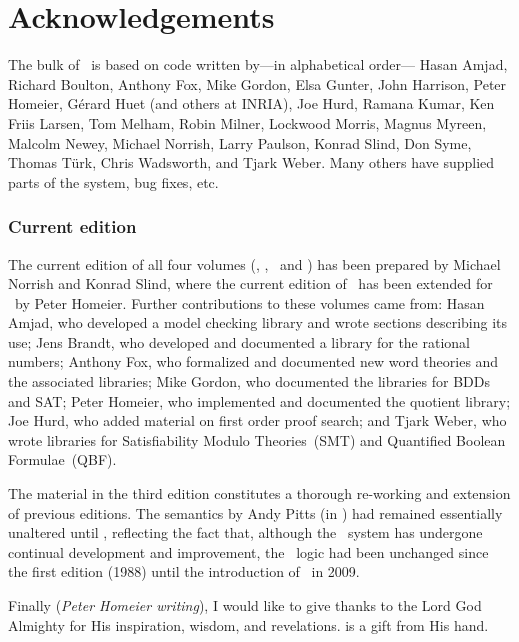 \chapter*{Acknowledgements}

The bulk of \HOLW\ is based on code written by---in alphabetical
order---%
Hasan Amjad,
Richard Boulton,
Anthony Fox,
Mike Gordon,
Elsa Gunter,
John Harrison,
Peter Homeier,
G\'erard Huet (and others at INRIA),
Joe Hurd,
Ramana Kumar,
Ken Friis Larsen,
Tom Melham,
Robin Milner,
Lockwood Morris,
Magnus Myreen,
Malcolm Newey,
Michael Norrish,
Larry Paulson,
Konrad Slind,
Don Syme,
Thomas T\"urk,
Chris Wadsworth,
and
Tjark Weber.
Many others have supplied parts of the system, bug fixes, etc.

\subsection*{Current edition}

The current edition of all four volumes (\LOGIC, \TUTORIAL,
\DESCRIPTION\ and \REFERENCE) has been prepared by Michael Norrish and
Konrad Slind, 
where the current edition of \TUTORIAL\ has been extended for \HOLW\ 
by Peter Homeier.
Further contributions to these volumes came from: Hasan
Amjad, who developed a model checking library and wrote sections
describing its use; Jens Brandt, who developed and documented a
library for the rational numbers; Anthony Fox, who formalized and
documented new word theories and the associated libraries; Mike
Gordon, who documented the libraries for BDDs and SAT; Peter Homeier,
who implemented and documented the quotient library; Joe Hurd, who
added material on first order proof search; and Tjark Weber, who wrote
libraries for Satisfiability Modulo Theories~(SMT) and Quantified
Boolean Formulae~(QBF).

\medskip

The material in the third edition constitutes a thorough re-working
and extension of previous editions.  The semantics by Andy Pitts (in \LOGIC)
had remained essentially unaltered until \HOLW, reflecting the fact
that, although the \HOL\ system has undergone continual development
and improvement, the \HOL\ logic had been unchanged since the first edition
(1988) until the introduction of \HOLW\ in 2009.

\medskip

Finally ({\it Peter Homeier writing}), I would like to give thanks to
the Lord God Almighty for His inspiration, wisdom, and revelations.
\HOLW{} is a gift from His hand.

